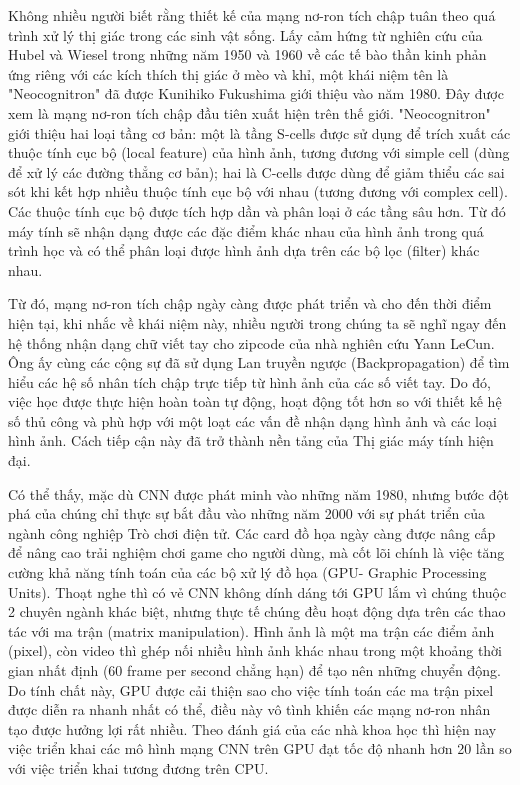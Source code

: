 \documentclass[a4paper]{article}
\begin{document}
Không nhiều người biết rằng thiết kế của mạng nơ-ron tích chập tuân theo quá trình xử lý thị giác trong các sinh vật sống. Lấy cảm hứng từ nghiên cứu của Hubel và Wiesel trong những năm 1950 và 1960 về các tế bào thần kinh phản ứng riêng với các kích thích thị giác ở mèo và khỉ, một khái niệm tên là "Neocognitron" đã được Kunihiko Fukushima giới thiệu vào năm 1980. Đây được xem là mạng nơ-ron tích chập đầu tiên xuất hiện trên thế giới. "Neocognitron" giới thiệu hai loại tầng cơ bản: một là tầng S-cells được sử dụng để trích xuất các thuộc tính cục bộ (local feature) của hình ảnh, tương đương với simple cell (dùng để xử lý các đường thẳng cơ bản); hai là C-cells được dùng để giảm thiểu các sai sót khi kết hợp nhiều thuộc tính cục bộ với nhau (tương đương với complex cell). Các thuộc tính cục bộ được tích hợp dần và phân loại ở các tầng sâu hơn. Từ đó máy tính sẽ nhận dạng được các đặc điểm khác nhau của hình ảnh trong quá trình học và có thể phân loại được hình ảnh dựa trên các bộ lọc (filter) khác nhau.  

Từ đó, mạng nơ-ron tích chập ngày càng được phát triển và cho đến thời điểm hiện tại, khi nhắc về khái niệm này, nhiều người trong chúng ta sẽ nghĩ ngay đến hệ thống nhận dạng chữ viết tay
cho zipcode của nhà nghiên cứu Yann LeCun. Ông ấy cùng các cộng sự đã sử dụng Lan truyền ngược (Backpropagation) để tìm hiểu các hệ số nhân tích chập trực tiếp từ hình ảnh của các số viết tay. Do đó, việc học được thực hiện hoàn toàn tự động, hoạt động tốt hơn so với thiết kế hệ số thủ công và phù hợp với một loạt các vấn đề nhận dạng hình ảnh và các loại hình ảnh. Cách tiếp cận này đã trở thành nền tảng của Thị giác máy tính hiện đại.

Có thể thấy, mặc dù CNN được phát minh vào những năm 1980, nhưng bước đột phá của chúng chỉ thực sự bắt đầu vào những năm 2000 với sự phát triển của ngành công nghiệp Trò chơi điện tử. Các card đồ họa ngày càng được nâng cấp để nâng cao trải nghiệm chơi game cho người dùng, mà cốt lõi chính là việc tăng cường khả năng tính toán của các bộ xử lý đồ họa (GPU- Graphic Processing Units). Thoạt
nghe thì có vẻ CNN không dính dáng tới GPU lắm vì chúng thuộc 2 chuyên ngành khác biệt, nhưng thực tế chúng đều hoạt động dựa trên các thao tác với ma trận (matrix manipulation). Hình ảnh là một ma trận các điểm ảnh (pixel), còn video thì ghép nối nhiều hình ảnh khác nhau trong một khoảng thời gian nhất định (60 frame
per second chẳng hạn) để tạo nên những chuyển động. Do tính chất này, GPU được cải thiện sao cho việc tính toán các ma trận pixel được diễn ra nhanh nhất có thể, điều này vô tình khiến các mạng nơ-ron nhân tạo được hưởng lợi rất nhiều. Theo đánh giá của các nhà khoa học thì hiện nay việc triển khai các mô hình mạng CNN trên GPU đạt tốc độ nhanh hơn 20 lần so với việc triển khai tương đương trên CPU.
\end{document}
